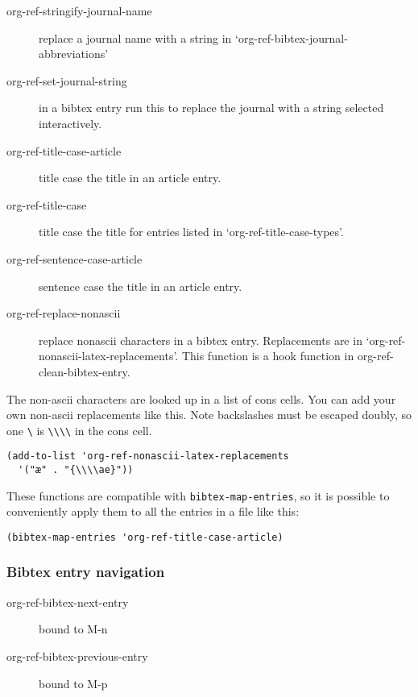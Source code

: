 \documentclass[11pt]{article}
\begin{document}
\begin{description}
\item[{org-ref-stringify-journal-name}] replace a journal name with a string in
`org-ref-bibtex-journal-abbreviations'
\item[{org-ref-set-journal-string}] in a bibtex entry run this to replace the journal
with a string selected interactively.

\item[{org-ref-title-case-article}] title case the title in an article entry.
\item[{org-ref-title-case}] title case the title for entries listed in `org-ref-title-case-types'.
\item[{org-ref-sentence-case-article}] sentence case the title in an article entry.

\item[{org-ref-replace-nonascii}] replace nonascii characters in a bibtex
entry. Replacements are in `org-ref-nonascii-latex-replacements'. This
function is a hook function in org-ref-clean-bibtex-entry.
\end{description}

The non-ascii characters are looked up in a list of cons cells. You can add your own non-ascii replacements like this. Note backslashes must be escaped doubly, so one \texttt{\textbackslash{}} is \texttt{\textbackslash{}\textbackslash{}\textbackslash{}\textbackslash{}} in the cons cell.

\begin{verbatim}
(add-to-list 'org-ref-nonascii-latex-replacements
  '("æ" . "{\\\\ae}"))
\end{verbatim}

These functions are compatible with \texttt{bibtex-map-entries}, so it is possible to conveniently apply them to all the entries in a file like this:

\begin{verbatim}
(bibtex-map-entries 'org-ref-title-case-article)
\end{verbatim}

\subsubsection{Bibtex entry navigation}
\label{sec:org2856a96}

\begin{description}
\item[{org-ref-bibtex-next-entry}] bound to M-n
\item[{org-ref-bibtex-previous-entry}] bound to M-p
\end{description}
\end{document}
